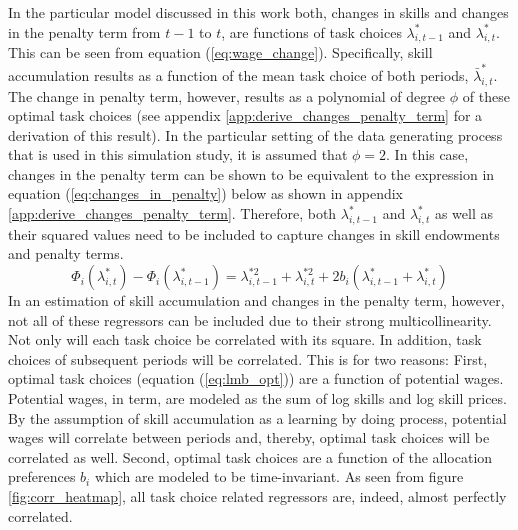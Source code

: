 \documentclass[../main.tex]{subfiles}
\begin{document}
In the particular model discussed in this work both, changes in skills and changes in the penalty term from $t-1$ to $t$, are functions of task choices $\lambda_{i,t-1}^*$ and $\lambda_{i,t}^*$. This can be seen from equation (\ref{eq:wage_change}). Specifically, skill accumulation results as a function of the mean task choice of both periods, $\bar{\lambda}_{i,t}^*$. The change in penalty term, however, results as a polynomial of degree $\phi$ of these optimal task choices (see appendix \ref{app:derive_changes_penalty_term} for a derivation of this result). In the particular setting of the data generating process that is used in this simulation study, it is assumed that $\phi = 2$. In this case, changes in the penalty term can be shown to be equivalent to the expression in equation (\ref{eq:changes_in_penalty}) below as shown in appendix \ref{app:derive_changes_penalty_term}. Therefore, both $\lambda_{i,t-1}^*$ and $\lambda_{i,t}^*$ as well as their squared values need to be included to capture changes in skill endowments and penalty terms.
\begin{equation}\label{eq:changes_in_penalty}
	\Phi_{i}(\lambda_{i,t}^*) - \Phi_{i}(\lambda_{i,t-1}^*) = \lambda_{i,t-1}^{*2} + \lambda_{i,t}^{*2} + 2b_i(\lambda_{i,t-1}^* + \lambda_{i,t}^*) 
\end{equation}
In an estimation of skill accumulation and changes in the penalty term, however, not all of these regressors can be included due to their strong multicollinearity. Not only will each task choice be correlated with its square. In addition, task choices of subsequent periods will be correlated. This is for two reasons: First, optimal task choices (equation (\ref{eq:lmb_opt})) are a function of potential wages. Potential wages, in term, are modeled as the sum of log skills and log skill prices. By the assumption of skill accumulation as a learning by doing process, potential wages will correlate between periods and, thereby, optimal task choices will be correlated as well. Second, optimal task choices are a function of the allocation preferences $b_i$ which are modeled to be time-invariant. As seen from figure \ref{fig:corr_heatmap}, all task choice related regressors are, indeed, almost perfectly correlated.
\\
\end{document}
